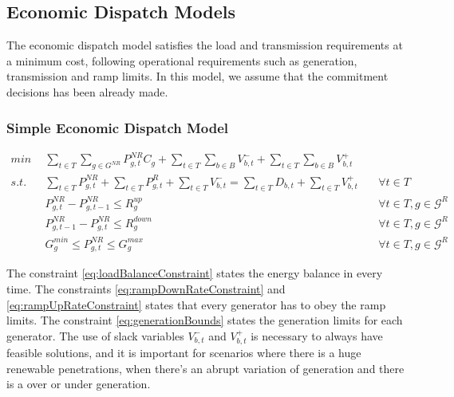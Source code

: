 \documentclass[12pt,LUDisStyle,twosided]{book}
\newcommand{\mc}{\mathcal}
\begin{document}
\subsection{Economic Dispatch Models}

The economic dispatch model satisfies the load and transmission requirements at a minimum cost, following operational requirements such as generation, transmission and ramp limits. In this model, we assume that the commitment decisions has been already made.

\subsubsection{Simple Economic Dispatch Model}

\begin{subequations}\label{model:simple_ED}
\begin{alignat}{4}
min ~~& \sum_{t \in T}\sum_{g \in G^{NR}} P^{NR}_{g,t} C_{g} + \sum_{t \in T}\sum_{b \in B} V^{-}_{b,t} + \sum_{t \in T}\sum_{b \in B} V^{+}_{b,t} \label{eq:ObjectiveFunction} \\
s.t. ~~~& \sum_{t \in T} P^{NR}_{g,t} + \sum_{t \in T} P^{R}_{g,t} + \sum_{t \in T}V^{-}_{b,t} = \sum_{t \in T} D_{b,t}  + \sum_{t \in T}V^{+}_{b,t}  &~& \forall t \in T  \label{eq:loadBalanceConstraint} \\
& P^{NR}_{g,t} - P^{NR}_{g,t - 1} \leq R^{up}_{g} &~& \forall t \in T, g \in \mc{G}^{R}\label{eq:rampUpRateConstraint} \\
& P^{NR}_{g,t -1 } - P^{NR}_{g,t} \leq R^{down}_{g} &~& \forall t \in T, g \in \mc{G}^{R}\label{eq:rampDownRateConstraint} \\
& G^{min}_{g}\leq P^{NR}_{g,t} \leq G^{max}_{g} &~& \forall t \in T, g \in \mc{G}^{R}\label{eq:generationBounds}
\end{alignat} 
\end{subequations}

The constraint \ref{eq:loadBalanceConstraint} states the energy balance in every time. The constraints \ref{eq:rampDownRateConstraint} and \ref{eq:rampUpRateConstraint} states that every generator has to obey the ramp limits. The constraint \ref{eq:generationBounds} states the generation limits for each generator. The use of slack variables $V^{-}_{b,t}$ and $V^{+}_{b,t}$ is necessary to always have feasible solutions, and it is important for scenarios where there is a huge renewable penetrations, when there's an abrupt variation of generation and there is a over or under generation.   
\end{document}
